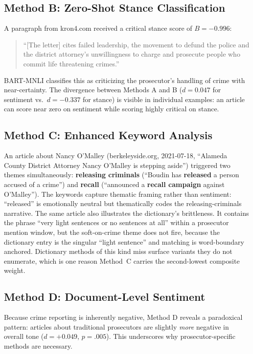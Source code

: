 \documentclass[12pt, letterpaper]{article}
\begin{document}
\begin{appendices}
\subsection*{Method B: Zero-Shot Stance Classification}

A paragraph from kron4.com received a critical stance score of $B = -0.996$:

\begin{quote}
``[The letter] cites failed leadership, the movement to defund the police and the district attorney's unwillingness to charge and prosecute people who commit life threatening crimes.''
\end{quote}

BART-MNLI classifies this as criticizing the prosecutor's handling of crime with near-certainty. The divergence between Methods A and B ($d = 0.047$ for sentiment vs.\ $d = -0.337$ for stance) is visible in individual examples: an article can score near zero on sentiment while scoring highly critical on stance.

\subsection*{Method C: Enhanced Keyword Analysis}

An article about Nancy O'Malley (berkeleyside.org, 2021-07-18, ``Alameda County District Attorney Nancy O'Malley is stepping aside'') triggered two themes simultaneously: \textbf{releasing criminals} (``Boudin has \textbf{released} a person accused of a crime'') and \textbf{recall} (``announced a \textbf{recall campaign} against O'Malley''). The keywords capture thematic framing rather than sentiment: ``released'' is emotionally neutral but thematically codes the releasing-criminals narrative. The same article also illustrates the dictionary's brittleness. It contains the phrase ``very light sentences or no sentences at all'' within a prosecutor mention window, but the soft-on-crime theme does not fire, because the dictionary entry is the singular ``light sentence'' and matching is word-boundary anchored. Dictionary methods of this kind miss surface variants they do not enumerate, which is one reason Method~C carries the second-lowest composite weight.

\subsection*{Method D: Document-Level Sentiment}

Because crime reporting is inherently negative, Method D reveals a paradoxical pattern: articles about traditional prosecutors are slightly \emph{more} negative in overall tone ($d = +0.049$, $p = .005$). This underscores why prosecutor-specific methods are necessary.


\end{appendices}
\end{document}
